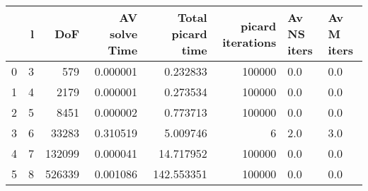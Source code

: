 \begin{tabular}{lrrrrrll}
\toprule
{} &  l &     DoF &  AV solve Time &  Total picard time &  picard iterations & Av NS iters & Av M iters \\
\midrule
0 &  3 &     579 &       0.000001 &           0.232833 &             100000 &         0.0 &        0.0 \\
1 &  4 &    2179 &       0.000001 &           0.273534 &             100000 &         0.0 &        0.0 \\
2 &  5 &    8451 &       0.000002 &           0.773713 &             100000 &         0.0 &        0.0 \\
3 &  6 &   33283 &       0.310519 &           5.009746 &                  6 &         2.0 &        3.0 \\
4 &  7 &  132099 &       0.000041 &          14.717952 &             100000 &         0.0 &        0.0 \\
5 &  8 &  526339 &       0.001086 &         142.553351 &             100000 &         0.0 &        0.0 \\
\bottomrule
\end{tabular}
